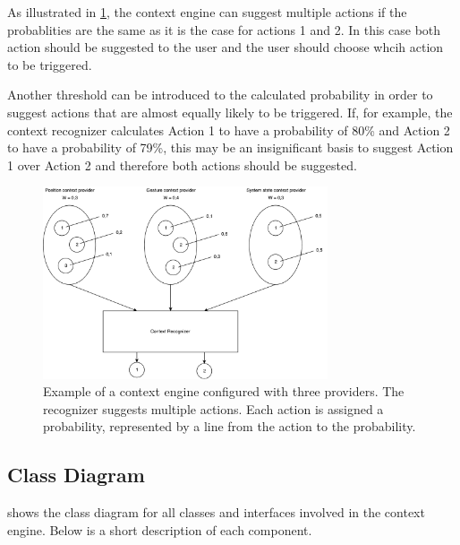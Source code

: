 As illustrated in \cref{fig:design:context-engine:multiple-suggestions}, the context engine can suggest multiple actions if the probablities are the same as it is the case for actions 1 and 2. In this case both action should be suggested to the user and the user should choose whcih action to be triggered.

Another threshold can be introduced to the calculated probability in order to suggest actions that are almost equally likely to be triggered. If, for example, the context recognizer calculates Action 1 to have a probability of 80\% and Action 2 to have a probability of 79\%, this may be an insignificant basis to suggest Action 1 over Action 2 and therefore both actions should be suggested.

\begin{figure}[h!]
\centering
\includegraphics[width=0.75\textwidth]{images/context-engine-multiple-suggestions}
\caption{Example of a context engine configured with three providers. The recognizer suggests multiple actions. Each action is assigned a probability, represented by a line from the action to the probability.}
\label{fig:design:context-engine:multiple-suggestions}
\end{figure}

\subsection{Class Diagram}
\label{sec:design:context-engine:class-diagram}

 shows the class diagram for all classes and interfaces involved in the context engine. Below is a short description of each component.

